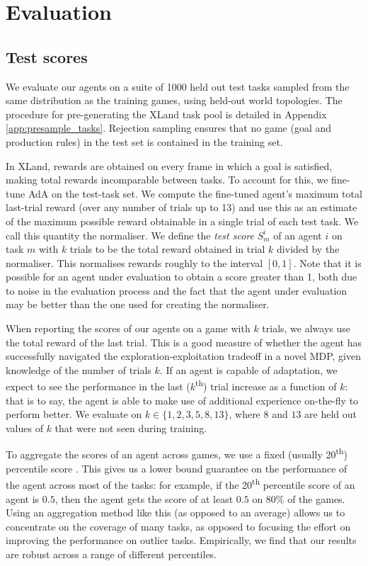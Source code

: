 \section{Evaluation} \label{sec:methods_evaluation}\label{app:evaluation}

\subsection{Test scores} We evaluate our agents on a suite of 1000 held out test tasks  sampled from the same distribution as the training games, using held-out world topologies. The procedure for pre-generating the XLand task pool is detailed in Appendix \ref{app:presample_tasks}. Rejection sampling ensures that no game (goal and production rules) in the test set is contained in the training set.

In XLand, rewards are obtained on every frame in which a goal is satisfied, making total rewards incomparable between tasks. To account for this, we fine-tune AdA on the test-task set. We compute the fine-tuned agent's maximum total last-trial reward
(over any number of trials up to 13)
and use this as an estimate of the maximum possible reward obtainable in a single trial of each test task. We call this quantity the normaliser. We define the \textit{test score} $S^i_m$ of an agent $i$ on task $m$ with $k$ trials to be the total reward obtained in trial $k$ divided by the normaliser. This normalises rewards roughly to the interval $[0, 1]$. Note that it is possible for an agent under evaluation to obtain a score greater than 1, both due to noise in the evaluation process and the fact that the agent under evaluation may be better than the one used for creating the normaliser.

When reporting the scores of our agents on a game with $k$ trials, we always use the total reward of the last trial. This is a good measure of whether the agent has successfully navigated the exploration-exploitation tradeoff in a novel MDP, given knowledge of the number of trials $k$. If an agent is capable of adaptation, we expect to see the performance in the last ($k$\textsuperscript{th}) trial increase as a function of $k$: that is to say, the agent is able to make use of additional experience on-the-fly to perform better. We evaluate on $k \in \{1, 2, 3, 5, 8, 13\}$, where $8$ and $13$ are held out values of $k$ that were not seen during training.

To aggregate the scores of an agent across games, we use a fixed (usually 20\textsuperscript{th}) percentile score \citep{DBLP:journals/corr/abs-2108-13264}. This gives us a lower bound guarantee on the performance of the agent across most of the tasks: for example, if the 20\textsuperscript{th} percentile score of an agent is $0.5$, then the agent gets the score of at least $0.5$ on $80\%$ of the games. Using an aggregation method like this (as opposed to an average) allows us to concentrate on the coverage of many tasks, as opposed to focusing the effort on improving the performance on outlier tasks. Empirically, we find that our results are robust across a range of different percentiles. 

